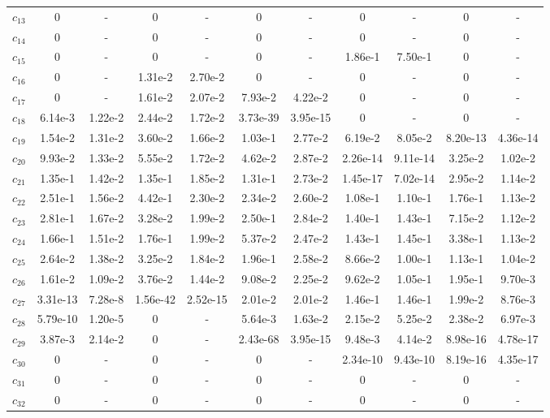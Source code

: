 \begin{table}[p]
{\begin{tabular}{lcc@{\hspace{16pt}}cc@{\hspace{16pt}}cc@{\hspace{16pt}}cc@{\hspace{16pt}}cc}
$c_{13}$ & 0 & - & 0 & - & 0 & - & 0 & - & 0 & - \\
$c_{14}$ & 0 & - & 0 & - & 0 & - & 0 & - & 0 & - \\
$c_{15}$ & 0 & - & 0 & - & 0 & - & 1.86e-1 & 7.50e-1 & 0 & - \\
$c_{16}$ & 0 & - & 1.31e-2 & 2.70e-2 & 0 & - & 0 & - & 0 & - \\
$c_{17}$ & 0 & - & 1.61e-2 & 2.07e-2 & 7.93e-2 & 4.22e-2 & 0 & - & 0 & - \\
$c_{18}$ & 6.14e-3 & 1.22e-2 & 2.44e-2 & 1.72e-2 & 3.73e-39 & 3.95e-15 & 0 & - & 0 & - \\
$c_{19}$ & 1.54e-2 & 1.31e-2 & 3.60e-2 & 1.66e-2 & 1.03e-1 & 2.77e-2 & 6.19e-2 & 8.05e-2 & 8.20e-13 & 4.36e-14 \\
$c_{20}$ & 9.93e-2 & 1.33e-2 & 5.55e-2 & 1.72e-2 & 4.62e-2 & 2.87e-2 & 2.26e-14 & 9.11e-14 & 3.25e-2 & 1.02e-2 \\
$c_{21}$ & 1.35e-1 & 1.42e-2 & 1.35e-1 & 1.85e-2 & 1.31e-1 & 2.73e-2 & 1.45e-17 & 7.02e-14 & 2.95e-2 & 1.14e-2 \\
$c_{22}$ & 2.51e-1 & 1.56e-2 & 4.42e-1 & 2.30e-2 & 2.34e-2 & 2.60e-2 & 1.08e-1 & 1.10e-1 & 1.76e-1 & 1.13e-2 \\
$c_{23}$ & 2.81e-1 & 1.67e-2 & 3.28e-2 & 1.99e-2 & 2.50e-1 & 2.84e-2 & 1.40e-1 & 1.43e-1 & 7.15e-2 & 1.12e-2 \\
$c_{24}$ & 1.66e-1 & 1.51e-2 & 1.76e-1 & 1.99e-2 & 5.37e-2 & 2.47e-2 & 1.43e-1 & 1.45e-1 & 3.38e-1 & 1.13e-2 \\
$c_{25}$ & 2.64e-2 & 1.38e-2 & 3.25e-2 & 1.84e-2 & 1.96e-1 & 2.58e-2 & 8.66e-2 & 1.00e-1 & 1.13e-1 & 1.04e-2 \\
$c_{26}$ & 1.61e-2 & 1.09e-2 & 3.76e-2 & 1.44e-2 & 9.08e-2 & 2.25e-2 & 9.62e-2 & 1.05e-1 & 1.95e-1 & 9.70e-3 \\
$c_{27}$ & 3.31e-13 & 7.28e-8 & 1.56e-42 & 2.52e-15 & 2.01e-2 & 2.01e-2 & 1.46e-1 & 1.46e-1 & 1.99e-2 & 8.76e-3 \\
$c_{28}$ & 5.79e-10 & 1.20e-5 & 0 & - & 5.64e-3 & 1.63e-2 & 2.15e-2 & 5.25e-2 & 2.38e-2 & 6.97e-3 \\
$c_{29}$ & 3.87e-3 & 2.14e-2 & 0 & - & 2.43e-68 & 3.95e-15 & 9.48e-3 & 4.14e-2 & 8.98e-16 & 4.78e-17 \\
$c_{30}$ & 0 & - & 0 & - & 0 & - & 2.34e-10 & 9.43e-10 & 8.19e-16 & 4.35e-17 \\
$c_{31}$ & 0 & - & 0 & - & 0 & - & 0 & - & 0 & - \\
$c_{32}$ & 0 & - & 0 & - & 0 & - & 0 & - & 0 & - \\
\bottomrule
\end{tabular}}
\endgroup
\end{table}
\clearpage
